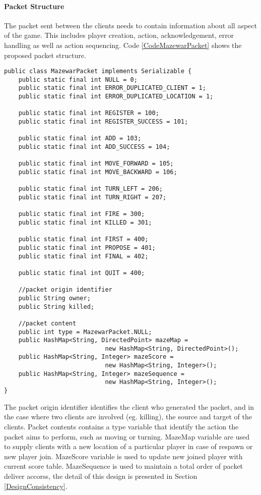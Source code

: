 \paragraph*{Packet Structure} The packet sent between the clients needs to contain information about all aspect of the game. This includes player creation, action, acknowledgement, error handling as well as action sequencing. Code \ref{CodeMazewarPacket} shows the proposed packet structure. 
\newpage
{
\singlespacing
\begin{lstlisting}[caption = {[MazewarPacket.java]Structure of packets exchanged between players}, label = CodeMazewarPacket]
public class MazewarPacket implements Serializable {
    public static final int NULL = 0;
    public static final int ERROR_DUPLICATED_CLIENT = 1;
    public static final int ERROR_DUPLICATED_LOCATION = 1;

    public static final int REGISTER = 100;
    public static final int REGISTER_SUCCESS = 101;

    public static final int ADD = 103;
    public static final int ADD_SUCCESS = 104;

    public static final int MOVE_FORWARD = 105;
    public static final int MOVE_BACKWARD = 106;

    public static final int TURN_LEFT = 206;
    public static final int TURN_RIGHT = 207;

    public static final int FIRE = 300;
    public static final int KILLED = 301;

    public static final int FIRST = 400;
    public static final int PROPOSE = 401;
    public static final int FINAL = 402;

    public static final int QUIT = 400;

    //packet origin identifier
    public String owner;
    public String killed;

	//packet content
    public int type = MazewarPacket.NULL;
    public HashMap<String, DirectedPoint> mazeMap = 
    						new HashMap<String, DirectedPoint>();
    public HashMap<String, Integer> mazeScore = 
    						new HashMap<String, Integer>();
    public HashMap<String, Integer> mazeSequence = 
    						new HashMap<String, Integer>();
}
\end{lstlisting}
}

The packet origin identifier identifies the client who generated the packet, and in the case where two clients are involved (eg. killing), the source and target of the clients. Packet contents contains a type variable that identify the action the packet aims to perform, such as moving or turning. MazeMap variable are used to supply clients with a new location of a particular player in case of respawn or new player join. MazeScore variable is used to update new joined player with current score table. MazeSequence is used to maintain a total order of packet deliver accorss, the detail of this design is presented in Section \ref{DesignConsistency}.

